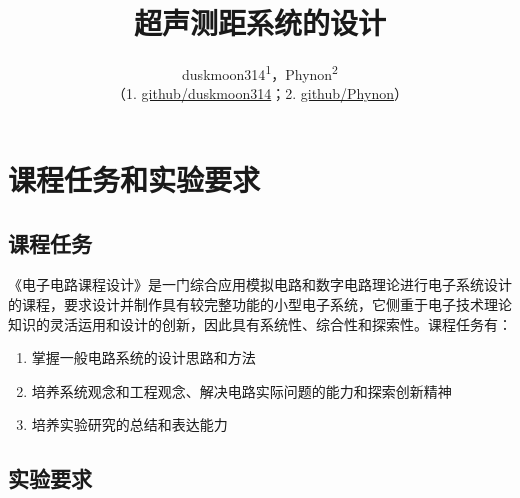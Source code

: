 \documentclass[a4paper, twocolumn]{ctexart}
\begin{document}
\pagestyle{plain}

\linespread{1}

\title{\textbf{超声测距系统的设计}}
\author{duskmoon314\textsuperscript{1}，Phynon\textsuperscript{2}\\
{\small （1. \href{https://github.com/duskmoon314}{github/duskmoon314}；2. \href{https://github.com/Phynon}{github/Phynon}）}
}
\date{}
\maketitle

\thispagestyle{fancy}
\lhead{}
\renewcommand{\headrulewidth}{1pt}

\setcounter{section}{-1}

\section{课程任务和实验要求}
\subsection{课程任务}
《电子电路课程设计》是一门综合应用模拟电路和数字电路理论进行电子系统设计的课程，要求设计并制作具有较完整功能的小型电子系统，它侧重于电子技术理论知识的灵活运用和设计的创新，因此具有系统性、综合性和探索性。课程任务有：
\begin{enumerate}
    \item 掌握一般电路系统的设计思路和方法
    \item 培养系统观念和工程观念、解决电路实际问题的能力和探索创新精神
    \item 培养实验研究的总结和表达能力
\end{enumerate}

\subsection{实验要求}
\end{document}
